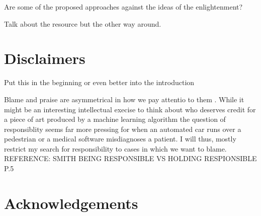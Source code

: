 \documentclass{article}
\begin{document}
Are some of the proposed approaches against the ideas of the enlightenment?

Talk about the resource but the other way around.
\section{Disclaimers}
Put this in the beginning or even better into the introduction

Blame and praise are asymmetrical in how we pay attentio to them . While it
might be an interesting intellectual execise to think about who deserves credit
for a piece of art produced by a machine learning algorithm the question of
responsiblity seems far more pressing for when an automated car runs over a
pedestrian or a medical software misdiagnoses a patient. I will thus, mostly
restrict my search for responsibility to cases in which we want to blame.
REFERENCE: SMITH BEING RESPONSIBLE VS HOLDING RESPIONSIBLE P.5
\section{Acknowledgements}
\clearpage

\printglossary[type=\acronymtype]
\printglossary
\printbibliography
\end{document}
